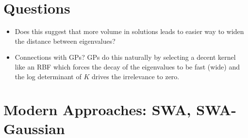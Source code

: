 \documentclass{article}
\begin{document}
\section{Questions}
\begin{itemize}
	\item Does this suggest that more volume in solutions leads to easier way to widen the distance between eigenvalues?
	\item Connections with GPs?
	\subitem GPs do this naturally by selecting a decent kernel like an RBF which forces the decay of the eigenvalues to be fast (wide) and the log determinant of $K$ drives the irrelevance to zero.
\end{itemize}








\section{Modern Approaches: SWA, SWA-Gaussian}
\end{document}
